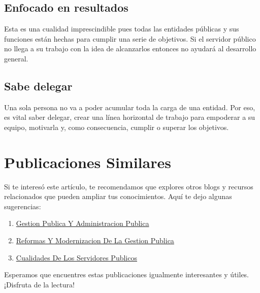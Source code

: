 \documentclass[
  jou,
  floatsintext,
  longtable,
  a4paper,
  nolmodern,
  notxfonts,
  notimes,
  12pt,
  colorlinks=true,linkcolor=blue,citecolor=blue,urlcolor=blue]{apa7}
\providecommand{\tightlist}{%
  \setlength{\itemsep}{0pt}\setlength{\parskip}{0pt}}
\begin{document}
\subsection{Enfocado en resultados}\label{enfocado-en-resultados}

Esta es una cualidad imprescindible pues todas las entidades públicas y
sus funciones están hechas para cumplir una serie de objetivos. Si el
servidor público no llega a su trabajo con la idea de alcanzarlos
entonces no ayudará al desarrollo general.

\subsection{Sabe delegar}\label{sabe-delegar}

Una sola persona no va a poder acumular toda la carga de una entidad.
Por eso, es vital saber delegar, crear una línea horizontal de trabajo
para empoderar a su equipo, motivarla y, como consecuencia, cumplir o
superar los objetivos.

\section{Publicaciones Similares}\label{publicaciones-similares}

Si te interesó este artículo, te recomendamos que explores otros blogs y
recursos relacionados que pueden ampliar tus conocimientos. Aquí te dejo
algunas sugerencias:

\begin{enumerate}
\def\labelenumi{\arabic{enumi}.}
\tightlist
\item
  \href{https://res-publica.netlify.app/posts/2021-10-01-gestion-publica-y-administracion-publica/index.pdf}{}
  \href{https://res-publica.netlify.app/posts/2021-10-01-gestion-publica-y-administracion-publica}{Gestion
  Publica Y Administracion Publica}
\item
  \href{https://res-publica.netlify.app/posts/2021-10-01-reformas-y-modernizacion-de-la-gestion-publica/index.pdf}{}
  \href{https://res-publica.netlify.app/posts/2021-10-01-reformas-y-modernizacion-de-la-gestion-publica}{Reformas
  Y Modernizacion De La Gestion Publica}
\item
  \href{https://res-publica.netlify.app/posts/2023-05-11-cualidades-de-los-servidores-publicos/index.pdf}{}
  \href{https://res-publica.netlify.app/posts/2023-05-11-cualidades-de-los-servidores-publicos}{Cualidades
  De Los Servidores Publicos}
\end{enumerate}

Esperamos que encuentres estas publicaciones igualmente interesantes y
útiles. ¡Disfruta de la lectura!
\end{document}
